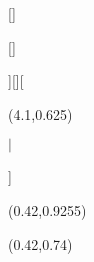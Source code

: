 {{\titleformat{\subsubsection}{\fontsize{11}\large\bfseries}{}{0pt}{{\thesubsubsection} \hspace{5pt} \bfseries}[\vspace{-1pt}]
}{
\titleformat{\section}{\fontsize{14}\large\bfseries\textcolor{\titleschemecolor}}{}{0pt}{\textcolor{\titleschemecolor}{\thesection} \hspace{3pt} \bfseries}%

\titleformat{\subsection}{\fontsize{13}\linespread\large\bfseries}{}{0pt}{%
	}[]%
\titlespacing*{\subsection}{0pt}{25pt}{10pt}

\titleformat{\subsubsection}{\fontsize{11}\linespread\large\bfseries}{}{0pt}{
	}[\vspace{-1pt}]

}

\sethead[
\makebox(\hbh, \hbl)[b]{
\colorbox{\boxcolor}{\makebox(\hbh, \hbl)[b]{\Large \bfseries  \textcolor{\boxtextcolor} \evenboxcontent \vspace{5pt} }}}
\hspace{3pt}
\iftoggle{headrule}{
\color{\rulecolor}\titlerule
}{}
][][
\begin{textblock}{2}(4.1,0.625)
\begin{flushright}
	\large \bfseries \textcolor{\titleschemecolor}{ \thesection \hspace{4pt} $|$ \hspace{1.5pt} \sectiontitle }
\end{flushright}
\end{textblock}
]
{
\begin{textblock}{5.801}(0.42,0.9255)
\iftoggle{headrule}{ %
	\color{\rulecolor}\titlerule 
}{}
\end{textblock}
\begin{textblock}{2}(0.42,0.74)
\large \bfseries \textcolor{\titleschemecolor}\doctype
\end{textblock}


}}
